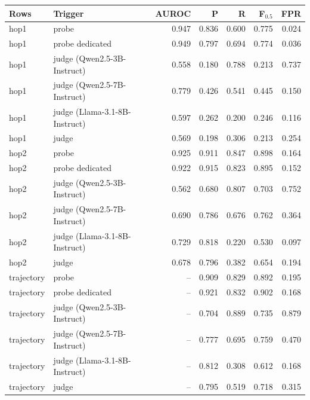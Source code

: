 \begin{tabular}{llrrrrr}
\toprule
Rows & Trigger & AUROC & P & R & F$_{0.5}$ & FPR \\
\midrule
hop1 & probe & 0.947 & 0.836 & 0.600 & 0.775 & 0.024 \\
hop1 & probe dedicated & 0.949 & 0.797 & 0.694 & 0.774 & 0.036 \\
hop1 & judge (Qwen2.5-3B-Instruct) & 0.558 & 0.180 & 0.788 & 0.213 & 0.737 \\
hop1 & judge (Qwen2.5-7B-Instruct) & 0.779 & 0.426 & 0.541 & 0.445 & 0.150 \\
hop1 & judge (Llama-3.1-8B-Instruct) & 0.597 & 0.262 & 0.200 & 0.246 & 0.116 \\
hop1 & judge & 0.569 & 0.198 & 0.306 & 0.213 & 0.254 \\
hop2 & probe & 0.925 & 0.911 & 0.847 & 0.898 & 0.164 \\
hop2 & probe dedicated & 0.922 & 0.915 & 0.823 & 0.895 & 0.152 \\
hop2 & judge (Qwen2.5-3B-Instruct) & 0.562 & 0.680 & 0.807 & 0.703 & 0.752 \\
hop2 & judge (Qwen2.5-7B-Instruct) & 0.690 & 0.786 & 0.676 & 0.762 & 0.364 \\
hop2 & judge (Llama-3.1-8B-Instruct) & 0.729 & 0.818 & 0.220 & 0.530 & 0.097 \\
hop2 & judge & 0.678 & 0.796 & 0.382 & 0.654 & 0.194 \\
trajectory & probe & – & 0.909 & 0.829 & 0.892 & 0.195 \\
trajectory & probe dedicated & – & 0.921 & 0.832 & 0.902 & 0.168 \\
trajectory & judge (Qwen2.5-3B-Instruct) & – & 0.704 & 0.889 & 0.735 & 0.879 \\
trajectory & judge (Qwen2.5-7B-Instruct) & – & 0.777 & 0.695 & 0.759 & 0.470 \\
trajectory & judge (Llama-3.1-8B-Instruct) & – & 0.812 & 0.308 & 0.612 & 0.168 \\
trajectory & judge & – & 0.795 & 0.519 & 0.718 & 0.315 \\
\bottomrule
\end{tabular}
